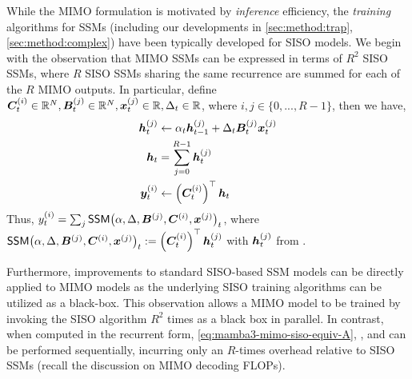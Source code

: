 While the MIMO formulation is motivated by \emph{inference} efficiency, the \emph{training} algorithms for SSMs (including our developments in \cref{sec:method:trap}, \cref{sec:method:complex}) have been typically developed for SISO models.
We begin with the observation that 
MIMO SSMs can be expressed in terms of $R^2$ SISO SSMs, where $R$ SISO SSMs sharing the same recurrence are summed for each of the $R$ MIMO outputs.
In particular,
define $ {\bm{C}}_t^{(i)} \in \mathbb{R}^N, {\bm{B}}_t^{(j)} \in \mathbb{R}^N, {\bm{x}}_t^{(j)} \in \mathbb{R}, \Delta_t \in \mathbb{R}$, where $i,j \in \{0, ..., R-1\}$, then we have,
\begin{align}
    {\bm{h}}_t^{(j)} &\gets \alpha_t{\bm{h}}_{t-1}^{(j)} + \Delta_t{\bm{B}}_t^{(j)} {\bm{x}}_t^{(j)} \label{eq:mamba3-mimo-siso-equiv-A}\\ 
    {\bm{h}}_t &= \sum_{j=0}^{R-1} {\bm{h}}_t^{(j)} \label{eq:mamba3-mimo-siso-equiv-B}\\
    {\bm{y}}_t^{(i)} &\gets \left({\bm{C}}_t^{(i)}\right)^\top {\bm{h}}_t \label{eq:mamba3-mimo-siso-equiv-C}
\end{align}
Thus, $y_t^{(i)} = \sum_j \mathsf{SSM}\!\left(\alpha,\Delta,{\bm{B}}^{(j)},{\bm{C}}^{(i)},{\bm{x}}^{(j)}\right)_t$, where $\mathsf{SSM}\!\left(\alpha,\Delta,{\bm{B}}^{(j)},{\bm{C}}^{(i)},{\bm{x}}^{(j)}\right)_t := \left({\bm{C}}_t^{(i)}\right)^\top {\bm{h}}_t^{(j)}$ with ${\bm{h}}_t^{(j)}$ from .

Furthermore, improvements to standard SISO-based SSM models can be directly applied to MIMO models as the underlying SISO training algorithms can be utilized as a black-box.
This observation allows a MIMO model to be trained by invoking the SISO algorithm $R^2$ times as a black box in parallel.
In contrast, when computed in the recurrent form, \eqref{eq:mamba3-mimo-siso-equiv-A}, , and  can be performed sequentially, incurring only an $R$-times overhead relative to SISO SSMs (recall the discussion on MIMO decoding FLOPs).

